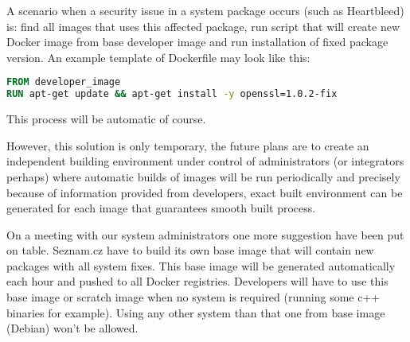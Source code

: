 A scenario when a security issue in a system package occurs (such as Heartbleed) is: find all images that uses this affected package, run script that will create new Docker image from base developer image and run installation of fixed package version. An example template of Dockerfile may look like this:

\begin{lstlisting}[language=dockerfile,caption=Dockerfile snippet]
FROM developer_image
RUN apt-get update && apt-get install -y openssl=1.0.2-fix
\end{lstlisting}

This process will be automatic of course.

However, this solution is only temporary, the future plans are to create an independent building environment under control of administrators (or integrators perhaps) where automatic builds of images will be run periodically and precisely because of information provided from developers, exact built environment can be generated for each image that guarantees smooth built process.

On a meeting with our system administrators one more suggestion have been put on table. Seznam.cz have to build its own base image that will contain new packages with all system fixes. This base image will be generated automatically each hour and pushed to all Docker registries. Developers will have to use this base image or scratch image when no system is required (running some c++ binaries for example). Using any other system than that one from base image (Debian) won’t be allowed.

